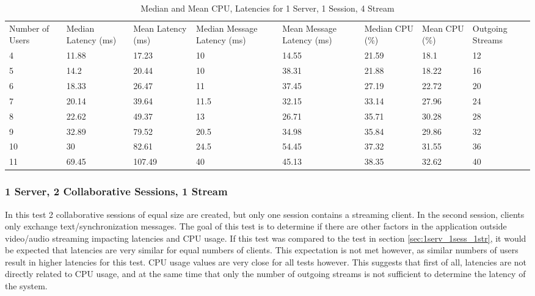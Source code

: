 \begin{table}
\caption{Median and Mean CPU, Latencies for 1 Server, 1 Session, 4 Stream}
\label{table:1serv_1sess_4str}
\begin{tabu} to\linewidth{|X[c]|X[c]|X[c]|X[c]|X[c]|X[c]|X[c]|X[c]|}
\everyrow{\hline}
\hline
Number of Users & Median Latency (ms) & Mean Latency (ms) & Median Message Latency (ms) & Mean Message Latency (ms) & Median CPU (\%) & Mean CPU (\%) & Outgoing Streams\\
4 & 11.88 & 17.23 & 10 & 14.55 & 21.59 & 18.1 & 12 \\
5 & 14.2 & 20.44 & 10 & 38.31 & 21.88 & 18.22 & 16 \\
6 & 18.33 & 26.47 & 11 & 37.45 & 27.19 & 22.72 & 20 \\
7 & 20.14 & 39.64 & 11.5 & 32.15 & 33.14 & 27.96 & 24 \\
8 & 22.62 & 49.37 & 13 & 26.71 & 35.71 & 30.28 & 28 \\
9 & 32.89 & 79.52 & 20.5 & 34.98 & 35.84 & 29.86 & 32 \\
10 & 30 & 82.61 & 24.5 & 54.45 & 37.32 & 31.55 & 36 \\
11 & 69.45 & 107.49 & 40 & 45.13 & 38.35 & 32.62 & 40 \\
\end{tabu}
\end{table}

\clearpage\subsubsection{1 Server, 2 Collaborative Sessions, 1 Stream}
\label{sec:1serv_2sess_1str180}

In this test 2 collaborative sessions of equal size are created, but only one session contains a streaming client. In the second session, clients only exchange text/synchronization messages. The goal of this test is to determine if there are other factors in the application outside video/audio streaming impacting latencies and CPU usage. If this test was compared to the test in section \ref{sec:1serv_1sess_1str}, it would be expected that latencies are very similar for equal numbers of clients. This expectation is not met however, as similar numbers of users result in higher latencies for this test. CPU usage values are very close for all tests however. This suggests that first of all, latencies are not directly related to CPU usage, and at the same time that only the number of outgoing streams is not sufficient to determine the latency of the system.

